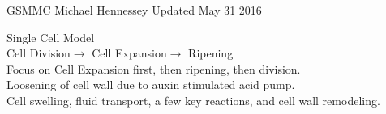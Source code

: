 
\pagestyle{empty}


\begin{center}
\large{ GSMMC \hspace{1in}  Michael Hennessey \hspace{1in}Updated May 31 2016}\end{center} 
\bigskip
Single Cell Model\\

Cell Division$\rightarrow$ Cell Expansion$\rightarrow$ Ripening\\

Focus on Cell Expansion first, then ripening, then division.\\

Loosening of cell wall due to auxin stimulated acid pump.\\

Cell swelling, fluid transport, a few key reactions, and cell wall remodeling.\\

